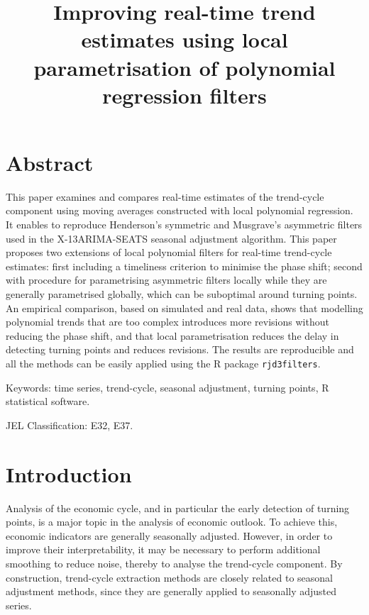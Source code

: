\documentclass[
]{article}
\title{Improving real-time trend estimates using local parametrisation
of polynomial regression filters}
\author{}
\date{}
\newcommand\1{\mathds{1}}
\begin{document}
\maketitle

\section*{Abstract}\label{abstract}

This paper examines and compares real-time estimates of the trend-cycle
component using moving averages constructed with local polynomial
regression. It enables to reproduce Henderson's symmetric and Musgrave's
asymmetric filters used in the X-13ARIMA-SEATS seasonal adjustment
algorithm. This paper proposes two extensions of local polynomial
filters for real-time trend-cycle estimates: first including a
timeliness criterion to minimise the phase shift; second with procedure
for parametrising asymmetric filters locally while they are generally
parametrised globally, which can be suboptimal around turning points. An
empirical comparison, based on simulated and real data, shows that
modelling polynomial trends that are too complex introduces more
revisions without reducing the phase shift, and that local
parametrisation reduces the delay in detecting turning points and
reduces revisions. The results are reproducible and all the methods can
be easily applied using the R package \texttt{rjd3filters}.

Keywords: time series, trend-cycle, seasonal adjustment, turning points,
R statistical software.

JEL Classification: E32, E37.

\section{Introduction}\label{introduction}

Analysis of the economic cycle, and in particular the early detection of
turning points, is a major topic in the analysis of economic outlook. To
achieve this, economic indicators are generally seasonally adjusted.
However, in order to improve their interpretability, it may be necessary
to perform additional smoothing to reduce noise, thereby to analyse the
trend-cycle component. By construction, trend-cycle extraction methods
are closely related to seasonal adjustment methods, since they are
generally applied to seasonally adjusted series.
\end{document}
